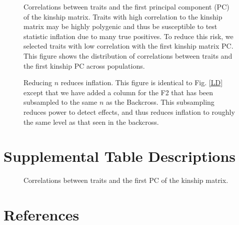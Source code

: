 \documentclass[10pt,letterpaper]{article}
\begin{document}
\begin{figure}[ht]
\centering
\caption{Correlations between traits and the first principal component (PC) of
the kinship matrix. Traits with high correlation to the kinship matrix may 
be highly polygenic and thus be susceptible to test statistic inflation due to 
many true positives. To reduce this risk, we selected traits with low correlation
with the first kinship matrix PC. This figure shows the distribution of correlations
between traits and the first kinship PC across populations. 
}
\label{fig:trait_cor}
\end{figure}

\begin{figure}[ht]
\centering
\caption{Reducing $n$ reduces inflation. 
This figure is identical to Fig. \ref{LD} except that we have added a column 
for the F2 that has been subsampled to the same $n$ as the Backcross. This 
subsampling reduces power to detect effects, and thus reduces inflation to 
roughly the same level as that seen in the backcross.
}
\label{subsampled}
\end{figure}

\hypertarget{supplemental-table-descriptions}{%
\section{Supplemental Table
Descriptions}\label{supplemental-table-descriptions}}

\begin{figure}[ht]
\centering
\caption{Correlations between traits and the first PC of the kinship matrix.
}
\label{table:trait_cor}
\end{figure}

\hypertarget{references}{%
\section*{References}\label{references}}

\nolinenumbers
\end{document}
